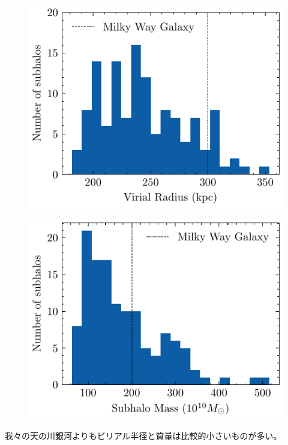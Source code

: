 \begin{figure}
	\centering
	\begin{minipage}[b]{0.45\linewidth}
		\centering
		\includegraphics[width=\linewidth]{pic/numsubhalo}
		\subcaption{}
		\label{fig:numsubhalo}
	\end{minipage}
	\begin{minipage}[b]{0.45\linewidth}
		\centering
		\includegraphics[width=\linewidth]{pic/EstimatedSubhaloMass}
		\subcaption{}
		\label{fig:estimatedsubhalomass}
	\end{minipage}
	\caption{}
	\label{fig:distribution_of_VR_MASS}
\end{figure}

我々の天の川銀河よりもビリアル半径と質量は比較的小さいものが多い。

